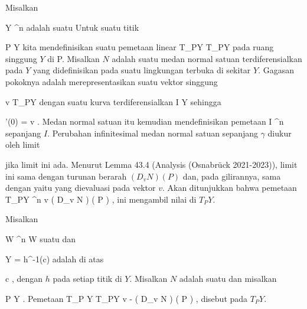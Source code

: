 \setcounter{section}{4}


Misalkan

\mavergleichskette
{\vergleichskette
{ Y
}
{ \subseteq }{ \R^n
}
{  }{
}
{    }{
}
{   }{
}
}
{}{}{}
adalah suatu
Untuk suatu titik

\mavergleichskette
{\vergleichskette
{ P
}
{ \in }{ Y
}
{  }{
}
{    }{
}
{   }{
}
}
{}{}{}
kita mendefinisikan suatu pemetaan linear
 { T_PY } { T_PY
} {}
pada ruang singgung $Y$ di P. Misalkan $N$ adalah suatu medan normal satuan terdiferensialkan pada $Y$ yang didefinisikan pada suatu lingkungan terbuka di sekitar $Y$. Gagasan pokoknya adalah merepresentasikan suatu vektor singgung

\mavergleichskette
{\vergleichskette
{ v
}
{ \in }{ T_PY
}
{  }{
}
{    }{
}
{   }{
}
}
{}{}{}
dengan suatu kurva terdiferensialkan
\maabbdisp {\gamma} { I } { Y
} {}
sehingga

\mavergleichskettedisp
{\vergleichskette
{ \gamma'(0)
}
{ =} { v
}
{ } {
}
{ } {
}
{ } {
}
}
{}{}{.}
Medan normal satuan itu kemudian mendefinisikan pemetaan
 { I } { \R^n
} {}
sepanjang $I$. Perubahan infinitesimal medan normal satuan sepanjang $\gamma$ diukur oleh limit

 {  }

jika limit ini ada. Menurut
Lemma 43.4 (Analysis (Osnabrück 2021-2023)),
limit ini sama dengan turunan berarah $\left(  D_{ v }  N   \right) \left(   P   \right)$ dan, pada gilirannya, sama dengan
 yaitu
yang dievaluasi pada vektor $v$. Akan ditunjukkan bahwa pemetaan
\maabbeledisp {} { T_PY } { \R^n
} {v } { \left(  D_{v}  N   \right) \left(   P   \right)
} {,}
ini mengambil nilai di $T_PY$.

{}
{

Misalkan

\mavergleichskette
{\vergleichskette
{ W
}
{ \subseteq }{ \R^n
}
{  }{
}
{    }{
}
{   }{
}
}
{}{}{}
 { W } { \R
} {}
suatu
dan

\mavergleichskette
{\vergleichskette
{ Y
}
{ = }{ h^{-1}(c)
}
{  }{
}
{    }{
}
{   }{
}
}
{}{}{}
adalah
di atas

\mavergleichskette
{\vergleichskette
{ c
}
{ \in }{ \R
}
{  }{
}
{    }{
}
{   }{
}
}
{}{}{,}
dengan $h$
pada setiap titik di $Y$. Misalkan $N$ adalah suatu
dan misalkan

\mavergleichskette
{\vergleichskette
{ P
}
{ \in }{ Y
}
{  }{
}
{    }{
}
{   }{
}
}
{}{}{.}
Pemetaan
 {T_P Y} { T_PY
} { v } { - \left(  D_{v}  N   \right) \left(   P  \right)
} {,}
disebut
pada $T_PY$.

}

